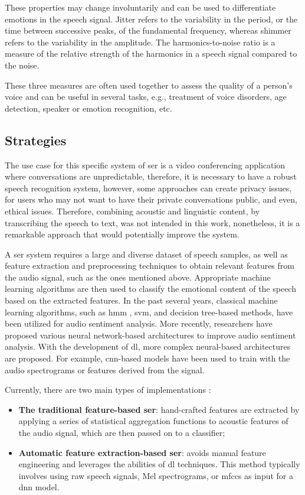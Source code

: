 These properties may change involuntarily and can be used to differentiate emotions in the speech signal. Jitter refers to the variability in the period, or the time between successive peaks, of the fundamental frequency, whereas shimmer refers to the variability in the amplitude. The harmonics-to-noise ratio is a measure of the relative strength of the harmonics in a speech signal compared to the noise.

These three measures are often used together to assess the quality of a person's voice and can be useful in several tasks, e.g., treatment of voice disorders, age detection, speaker or emotion recognition, etc.

\subsection{Strategies}

The use case for this specific system of \ac{ser} is a video conferencing application where conversations are unpredictable, therefore, it is necessary to have a robust speech recognition system, however, some approaches can create privacy issues, for users who may not want to have their private conversations public, and even, ethical issues. Therefore, combining acoustic and linguistic content, by transcribing the speech to text, was not intended in this work, nonetheless, it is a remarkable approach that would potentially improve the system.

A \ac{ser} system requires a large and diverse dataset of speech samples, as well as feature extraction and preprocessing techniques to obtain relevant features from the audio signal, such as the ones mentioned above. Appropriate machine learning algorithms are then used to classify the emotional content of the speech based on the extracted features. In the past several years, classical machine learning algorithms, such as \ac{hmm} \cite{1220939}, \ac{svm}, and decision tree-based methods, have been utilized for audio sentiment analysis. More recently, researchers have proposed various neural network-based architectures to improve audio sentiment analysis. With the development of \ac{dl}, more complex neural-based architectures are proposed. For example, \ac{cnn}-based models have been used to train with the audio spectrograms or features derived from the signal.

Currently, there are two main types of implementations \cite{Zhao2018}:
\begin{itemize}
	\item \textbf{The traditional feature-based \ac{ser}}: hand-crafted features are extracted by applying a series of statistical aggregation functions to acoustic features of the audio signal, which are then passed on to a classifier;
	\item \textbf{Automatic feature extraction-based \ac{ser}}: avoids manual feature engineering and leverages the abilities of \ac{dl} techniques. This method typically involves using raw speech signals, Mel spectrograms, or \ac{mfccs} as input for a \ac{dnn} model.
\end{itemize}


